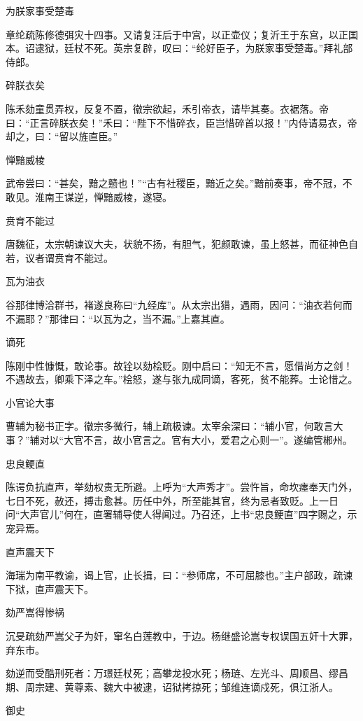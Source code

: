 \documentclass[a4paper,12pt,UTF8,twoside]{ctexbook}
\begin{document}
    为朕家事受楚毒
    
    章纶疏陈修德弭灾十四事。又请复汪后于中宫，以正壶仪；复沂王于东宫，以正国本。诏逮狱，廷杖不死。英宗复辟，叹曰：“纶好臣子，为朕家事受楚毒。”拜礼部侍郎。
    
    碎朕衣矣
    
    陈禾劾童贯弄权，反复不置，徽宗欲起，禾引帝衣，请毕其奏。衣裾落。帝曰：“正言碎朕衣矣！”禾曰：“陛下不惜碎衣，臣岂惜碎首以报！”内侍请易衣，帝却之，曰：“留以旌直臣。”
    
    惮黯威棱
    
    武帝尝曰：“甚矣，黯之戆也！”“古有社稷臣，黯近之矣。”黯前奏事，帝不冠，不敢见。淮南王谋逆，惮黯威棱，遂寝。
    
    贲育不能过
    
    唐魏征，太宗朝谏议大夫，状貌不扬，有胆气，犯颜敢谏，虽上怒甚，而征神色自若，议者谓贲育不能过。
    
    瓦为油衣
    
    谷那律博洽群书，褚遂良称曰“九经库”。从太宗出猎，遇雨，因问：“油衣若何而不漏耶？”那律曰：“以瓦为之，当不漏。”上嘉其直。
    
    谪死
    
    陈刚中性慷慨，敢论事。故铨以劾桧贬。刚中启曰：“知无不言，愿借尚方之剑！不遇故去，卿乘下泽之车。”桧怒，遂与张九成同谪，客死，贫不能葬。士论惜之。
    
    小官论大事
    
    曹辅为秘书正字。徽宗多微行，辅上疏极谏。太宰余深曰：“辅小官，何敢言大事？”辅对以“大官不言，故小官言之。官有大小，爱君之心则一”。遂编管郴州。
    
    忠良鲠直
    
    陈谔负抗直声，举劾权贵无所避。上呼为“大声秀才”。尝忤旨，命坎瘗奉天门外，七日不死，赦还，搏击愈甚。历任中外，所至能其官，终为忌者致贬。上一日问“大声官儿”何在，直署辅导使人得闻过。乃召还，上书“忠良鲠直”四字赐之，示宠异焉。
    
    直声震天下
    
    海瑞为南平教谕，谒上官，止长揖，曰：“参师席，不可屈膝也。”主户部政，疏谏下狱，直声震天下。
    
    劾严嵩得惨祸
    
    沉旻疏劾严嵩父子为奸，窜名白莲教中，于边。杨继盛论嵩专权误国五奸十大罪，弃东市。
    
    劾逆而受酷刑死者：万璟廷杖死；高攀龙投水死；杨琏、左光斗、周顺昌、缪昌期、周宗建、黄尊素、魏大中被逮，诏狱拷掠死；邹维连谪戍死，俱江浙人。
    
    御史
    
\end{document}
